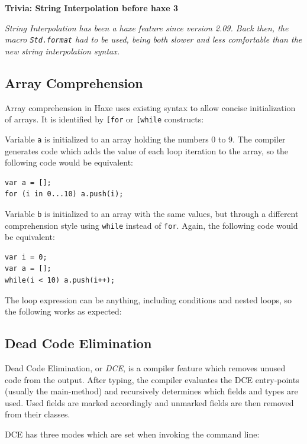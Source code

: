 \documentclass{article}
\newcommand{\expr}[1]{\texttt{#1}}
\newenvironment{myshaded}
  {\def\FrameCommand{\fboxsep=\topsep\colorbox{bgcolor}}%
  \MakeFramed {\advance\hsize-\width \FrameRestore}}%
 {\endMakeFramed}
\newcommand{\trivia}[2]
	{\begin{myshaded}\noindent\textbf{Trivia: #1}\par\nobreak\noindent\ignorespaces\textit{#2}\end{myshaded}}
\newcommand{\haxe}[2][]{%
}
\begin{document}
\trivia{String Interpolation before haxe 3}{String Interpolation has been a haxe feature since version 2.09. Back then, the macro \expr{Std.format} had to be used, being both slower and less comfortable than the new string interpolation syntax.}


\subsection{Array Comprehension}
\label{Array Comprehension}

Array comprehension in Haxe uses existing syntax to allow concise initialization of arrays. It is identified by \expr{[for} or \expr{[while} constructs:

\haxe{assets/ArrayComprehension.hx}

Variable \expr{a} is initialized to an array holding the numbers 0 to 9. The compiler generates code which adds the value of each loop iteration to the array, so the following code would be equivalent:

\begin{lstlisting}
var a = [];
for (i in 0...10) a.push(i);
\end{lstlisting}

Variable \expr{b} is initialized to an array with the same values, but through a different comprehension style using \expr{while} instead of \expr{for}. Again, the following code would be equivalent:

\begin{lstlisting}
var i = 0;
var a = [];
while(i < 10) a.push(i++);
\end{lstlisting}

The loop expression can be anything, including conditions and nested loops, so the following works as expected:

\haxe{assets/AdvArrayComprehension.hx}

\subsection{Dead Code Elimination}
\label{Dead Code Elimination}

Dead Code Elimination, or \emph{DCE}, is a compiler feature which removes unused code from the output. After typing, the compiler evaluates the DCE entry-points (usually the main-method) and recursively determines which fields and types are used. Used fields are marked accordingly and unmarked fields are then removed from their classes.

DCE has three modes which are set when invoking the command line:
\end{document}
